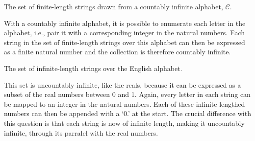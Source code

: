 \documentclass[11pt]{article}
\begin{document}
\begin{Parts}
\begin{solution}
\end{solution}

\Part The set of finite-length strings drawn from a countably infinite alphabet, 
$\mathcal{C}$.

\begin{solution}
    
    With a countably infinite alphabet, it is possible to enumerate each letter 
    in the alphabet, i.e., pair it with a corresponding integer in the natural 
    numbers. Each string in the set of finite-length strings over this alphabet
    can then be expressed as a finite natural number and the collection is therefore
    countably infinite. 

\end{solution}

\Part The set of infinite-length strings over the English alphabet.

\begin{solution}
    
    This set is uncountably infinite, like the reals, because it can be expressed
    as a subset of the real numbers between 0 and 1. Again, every letter in each
    string can be mapped to an integer in the natural numbers. Each of these
    infinite-lengthed numbers can then be appended with a `0.' at the start. The
    crucial difference with this question is that each string is now of infinite 
    length, making it uncountably infinite, through its parralel with the real 
    numbers. 

\end{solution}

\end{Parts}
\end{document}
